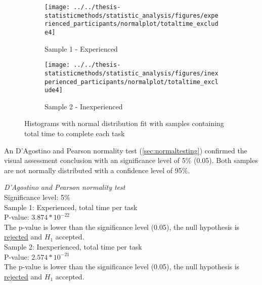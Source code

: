 \begin{figure}[H]
	\centering
	\begin{subfigure}[b]{0.48\textwidth}
		\centering
		\texttt{[image: ../../thesis-statisticmethods/statistic\_analysis/figures/experienced\_participants/normalplot/totaltime\_exclude4]}
		\caption{Sample 1 - Experienced}
		\label{fig:totaltimeexclude4_experienced}
	\end{subfigure}
	\begin{subfigure}[b]{0.48\textwidth}
		\centering
		\texttt{[image: ../../thesis-statisticmethods/statistic\_analysis/figures/inexperienced\_participants/normalplot/totaltime\_exclude4]}
		\caption{Sample 2 - Inexperienced}
		\label{fig:totaltimeexclude4_inexperienced}
	\end{subfigure}
\caption{Histograms with normal distribution fit with samples containing total time to complete each task}
\end{figure}

An D'Agostino and Pearson normality test (\ref{sec:normaltesting}) confirmed the visual assessment conclusion with an significance level of 5\% (0.05). Both samples are not normally distributed with a confidence level of 95\%. \\[0.5cm]

\begin{center}
	\begin{tcolorbox}[box align=center,width=\textwidth-5cm]
			\centering
				\textit{D'Agostino and Pearson normality test}\\
				Significance level: 5\%  \\[0.5cm]
	
				Sample 1: Experienced, total time per task\\
				P-value: $3.874 * 10^{-22}$\\
				The p-value is lower than the significance level (0.05), the null hypothesis is \underline{rejected} and $H_1$ accepted.\\[0.5cm]
				
				Sample 2: Inexperienced, total time per task \\
				P-value: $2.574 * 10^{-21}$ \\
				The p-value is lower than the significance level (0.05), the null hypothesis is \underline{rejected} and $H_1$ accepted.\\[0.5cm]
	\end{tcolorbox} 
\end{center}

